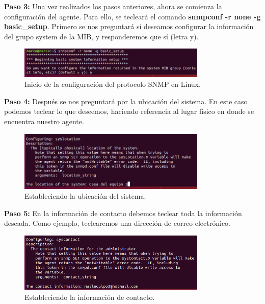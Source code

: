 \noindent
\newline
\textbf{Paso 3:}  Una vez realizados los pasos anteriores, ahora se comienza la configuración del agente. Para ello, se tecleará el comando \textbf{snmpconf -r none -g basic\_setup}. Primero se nos preguntará si deseamos configurar la información del grupo system de la MIB, y responderemos que sí (letra y).

\begin{figure}[htbp!]
	\centering
		\includegraphics[width=0.8\textwidth]{images/desarrollo/configuracion_linux3.png}
	\caption{Inicio de la configuración del protocolo SNMP en Linux.}
\end{figure}

\noindent
\newline
\textbf{Paso 4:} Después se nos preguntará por la ubicación del sistema. En este caso podemos teclear lo que deseemos, haciendo referencia al lugar físico en donde se encuentra nuestro agente. 

\begin{figure}[htbp!]
	\centering
		\includegraphics[width=0.8\textwidth]{images/desarrollo/configuracion_linux4.png}
	\caption{Estableciendo la ubicación del sistema.}
\end{figure}

\noindent
\newline
\textbf{Paso 5:} En la información de contacto debemos teclear toda la información deseada. Como ejemplo, teclearemos una dirección de correo electrónico.

\begin{figure}[htbp!]
	\centering
		\includegraphics[width=0.8\textwidth]{images/desarrollo/configuracion_linux5.png}
	\caption{Estableciendo la información de contacto.}
\end{figure}

